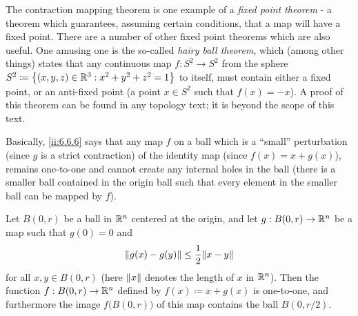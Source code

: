 \begin{rmk}\label{ii:6.6.5}
  The contraction mapping theorem is one example of a \emph{fixed point theorem}
  - a theorem which guarantees, assuming certain conditions, that a map will have a fixed point.
  There are a number of other fixed point theorems which are also useful.
  One amusing one is the so-called \emph{hairy ball theorem}, which (among other things) states that any continuous map \(f : S^2 \to S^2\) from the sphere \(S^2 \coloneqq \set{(x, y, z) \in \R^3 : x^2 + y^2 + z^2 = 1}\) to itself, must contain either a fixed point, or an anti-fixed point
  (a point \(x \in S^2\) such that \(f(x) = -x\)).
  A proof of this theorem can be found in any topology text;
  it is beyond the scope of this text.
\end{rmk}

\begin{note}
  Basically, \cref{ii:6.6.6} says that any map \(f\) on a ball which is a ``small'' perturbation (since \(g\) is a strict contraction) of the identity map (since \(f(x) = x + g(x)\)), remains one-to-one and cannot create any internal holes in the ball
  (there is a smaller ball contained in the origin ball such that every element in the smaller ball can be mapped by \(f\)).
\end{note}

\begin{lem}\label{ii:6.6.6}
  Let \(B(0, r)\) be a ball in \(\R^n\) centered at the origin, and let \(g : B(0, r) \to \R^n\) be a map such that \(g(0) = 0\) and
  \[
    \norm*{g(x) - g(y)} \leq \dfrac{1}{2} \norm*{x - y}
  \]
  for all \(x, y \in B(0, r)\)
  (here \(\norm*{x}\) denotes the length of \(x\) in \(\R^n\)).
  Then the function \(f : B(0, r) \to \R^n\) defined by \(f(x) \coloneqq x + g(x)\) is one-to-one, and furthermore the image \(f\big(B(0, r)\big)\) of this map contains the ball \(B(0, r / 2)\).
\end{lem}


